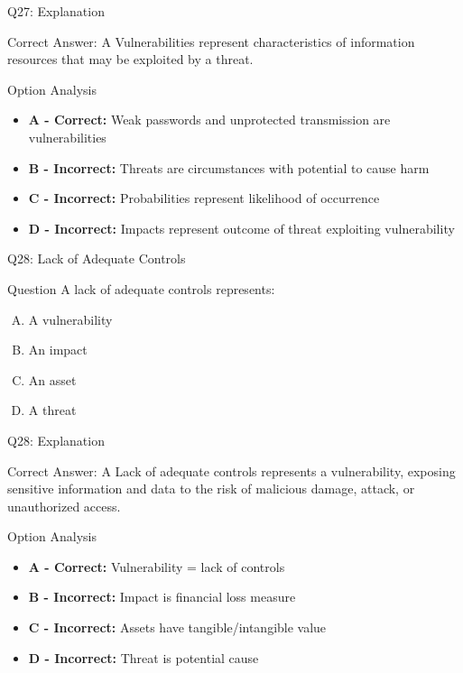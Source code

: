 \documentclass{beamer}
\begin{document}
	\begin{frame}{Q27: Explanation}
		\begin{block}{Correct Answer: A}
			Vulnerabilities represent characteristics of information resources that may be exploited by a threat.
		\end{block}
		\begin{block}{Option Analysis}
			\begin{itemize}
				\item \textbf{A - Correct:} Weak passwords and unprotected transmission are vulnerabilities
				\item \textbf{B - Incorrect:} Threats are circumstances with potential to cause harm
				\item \textbf{C - Incorrect:} Probabilities represent likelihood of occurrence
				\item \textbf{D - Incorrect:} Impacts represent outcome of threat exploiting vulnerability
			\end{itemize}
		\end{block}
	\end{frame}
	
	\begin{frame}{Q28: Lack of Adequate Controls}
		\begin{block}{Question}
			A lack of adequate controls represents:
		\end{block}
		\begin{enumerate}[(A)]
			\item A vulnerability
			\item An impact
			\item An asset
			\item A threat
		\end{enumerate}
	\end{frame}
	
	\begin{frame}{Q28: Explanation}
		\begin{block}{Correct Answer: A}
			Lack of adequate controls represents a vulnerability, exposing sensitive information and data to the risk of malicious damage, attack, or unauthorized access.
		\end{block}
		\begin{block}{Option Analysis}
			\begin{itemize}
				\item \textbf{A - Correct:} Vulnerability = lack of controls
				\item \textbf{B - Incorrect:} Impact is financial loss measure
				\item \textbf{C - Incorrect:} Assets have tangible/intangible value
				\item \textbf{D - Incorrect:} Threat is potential cause
			\end{itemize}
		\end{block}
	\end{frame}
	
\end{document}
